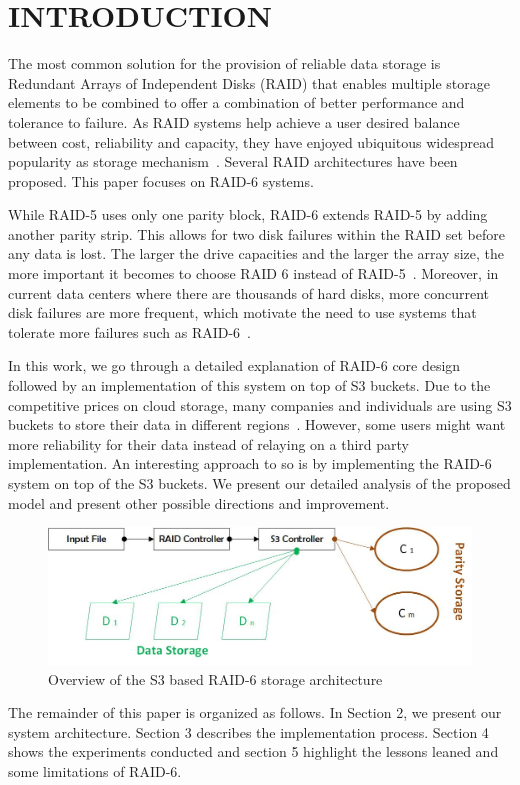 \section{INTRODUCTION}
\label{sec:intro}

The  most  common  solution  for  the  provision  of  reliable data  storage  is  Redundant Arrays of Independent Disks (RAID) that enables multiple storage elements to be combined to offer a combination of better performance and tolerance to failure.
As RAID systems help achieve a user desired balance between cost, reliability and capacity, they have enjoyed ubiquitous widespread popularity as storage mechanism~\cite{raid_survey}. Several RAID architectures have been proposed. This paper focuses on RAID-6 systems.

While RAID-5 uses only one parity block, RAID-6 extends RAID-5 by adding another parity strip. This allows for two disk failures within the RAID set before any data is lost. The larger the drive capacities and the larger the array size, the more important it becomes to choose RAID 6 instead of RAID-5~\cite{raid6_stop_2019}. Moreover, in current data centers where there are thousands of hard disks, more concurrent disk failures are more frequent, which motivate the need to use systems that tolerate more failures such as RAID-6~\cite{Failure_Trends_2007}.

In this work, we go through a detailed explanation of RAID-6 core design followed by an implementation of this system on top of S3 buckets. Due to the competitive prices on cloud storage, many companies and individuals are using S3 buckets to store their data in different regions~\cite{cloud_2020}. However, some users might want more reliability for their data instead of relaying on a third party implementation. An interesting approach to so is by implementing the RAID-6 system on top of the S3 buckets. We present our detailed analysis of the proposed model and present other possible directions and improvement. 



\begin{figure}
    \centering
    \includegraphics[width=\textwidth]{figures/over_0.jpg}
    \caption {Overview of the S3 based RAID-6 storage architecture}
    \label{fig:overview}
\end{figure}




The remainder of this paper is organized as follows. In
Section 2, we present our system architecture. Section
3 describes the implementation process. Section 4 shows the experiments conducted and section 5 highlight the lessons leaned and some limitations of RAID-6.





